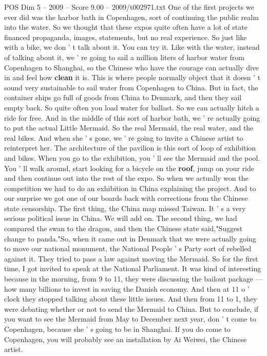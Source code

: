\begin{textsample}{POS Dim 5 – 2009 – Score 9.00 – 2009/t002971.txt}
One of the first projects we ever did was the harbor bath in Copenhagen, sort of continuing the public realm into the water.
So we thought that these expos quite often have a lot of state financed propaganda, images, statements, but no real experience.
So just like with a bike, we don ' t talk about it.
You can try it.
Like with the water, instead of talking about it, we ' re going to sail a million liters of harbor water from Copenhagen to Shanghai, so the Chinese who have the courage can actually dive in and feel how \textbf{clean} it is.
This is where people normally object that it doesn ' t sound very sustainable to sail water from Copenhagen to China.
But in fact, the container ships go full of goods from China to Denmark, and then they sail empty back.
So quite often you load water for ballast.
So we can actually hitch a ride for free.
And in the middle of this sort of harbor bath, we ' re actually going to put the actual Little Mermaid.
So the real Mermaid, the real water, and the real bikes.
And when she ' s gone, we ' re going to invite a Chinese artist to reinterpret her.
The architecture of the pavilion is this sort of loop of exhibition and bikes.
When you go to the exhibition, you ' ll see the Mermaid and the pool.
You ' ll walk around, start looking for a bicycle on the \textbf{roof}, jump on your ride and then continue out into the rest of the expo.
So when we actually won the competition we had to do an exhibition in China explaining the project.
And to our surprise we got one of our boards back with corrections from the Chinese state censorship.
The first thing, the China map missed Taiwan.
It ' s a very serious political issue in China.
We will add on.
The second thing, we had compared the swan to the dragon, and then the Chinese state said,"Suggest change to panda."So, when it came out in Denmark that we were actually going to move our national monument, the National People ' s Party sort of rebelled against it.
They tried to pass a law against moving the Mermaid.
So for the first time, I got invited to speak at the National Parliament.
It was kind of interesting because in the morning, from 9 to 11, they were discussing the bailout package — how many billions to invest in saving the Danish economy.
And then at 11 o ' clock they stopped talking about these little issues.
And then from 11 to 1, they were debating whether or not to send the Mermaid to China.
But to conclude, if you want to see the Mermaid from May to December next year, don ' t come to Copenhagen, because she ' s going to be in Shanghai.
If you do come to Copenhagen, you will probably see an installation by Ai Weiwei, the Chinese artist.

\end{textsample}
